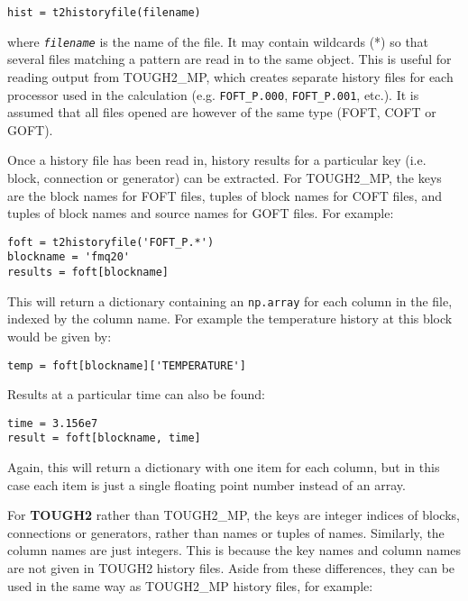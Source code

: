 \begin{lstlisting}
hist = t2historyfile(filename)
\end{lstlisting}

where \texttt{\emph{filename}} is the name of the file.  It may contain wildcards (*) so that several files matching a pattern are read in to the same object.  This is useful for reading output from TOUGH2\_MP, which creates separate history files for each processor used in the calculation (e.g. \texttt{FOFT\_P.000}, \texttt{FOFT\_P.001}, etc.).  It is assumed that all files opened are however of the same type (FOFT, COFT or GOFT).

Once a history file has been read in, history results for a particular key (i.e. block, connection or generator) can be extracted.  For TOUGH2\_MP, the keys are the block names for FOFT files, tuples of block names for COFT files, and tuples of block names and source names for GOFT files.  For example:

\begin{lstlisting}
foft = t2historyfile('FOFT_P.*')
blockname = 'fmq20'
results = foft[blockname]
\end{lstlisting}

This will return a dictionary containing an \texttt{np.array} for each column in the file, indexed by the column name.  For example the temperature history at this block would be given by:

\begin{lstlisting}
temp = foft[blockname]['TEMPERATURE']
\end{lstlisting}

Results at a particular time can also be found:

\begin{lstlisting}
time = 3.156e7
result = foft[blockname, time]
\end{lstlisting}

Again, this will return a dictionary with one item for each column, but in this case each item is just a single floating point number instead of an array.

For \textbf{TOUGH2} rather than TOUGH2\_MP, the keys are integer indices of blocks, connections or generators, rather than names or tuples of names.  Similarly, the column names are just integers.  This is because the key names and column names are not given in TOUGH2 history files.  Aside from these differences, they can be used in the same way as TOUGH2\_MP history files, for example:

